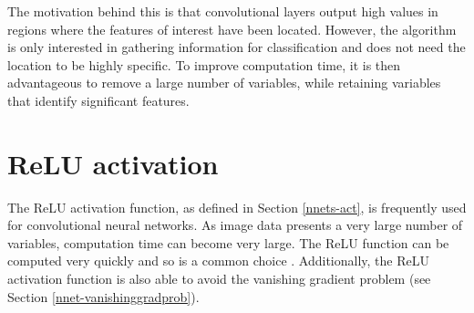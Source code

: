 The motivation behind this is that convolutional layers output high values in regions where the features of interest have been located. However, the algorithm is only interested in gathering information for classification and does not need the location to be highly specific. To improve computation time, it is then advantageous to remove a large number of variables, while retaining variables that identify significant features.

\section{ReLU activation}\label{convnets-act}

The ReLU activation function, as defined in Section \ref{nnets-act}, is frequently used for  convolutional neural networks. As image data presents a very large number of variables, computation time can become very large. The ReLU function can be computed very quickly and so is a common choice \cite{ADeshpande2016}. Additionally, the ReLU activation function is also able to avoid the vanishing gradient problem (see Section \ref{nnet-vanishinggradprob}).


%
%


%
%
%
%


